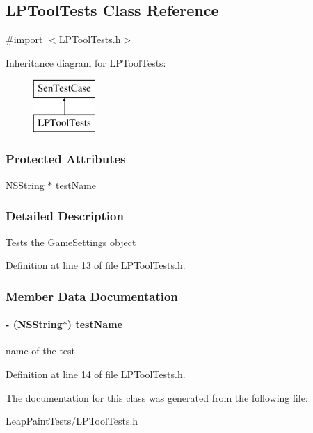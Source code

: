 \hypertarget{interface_l_p_tool_tests}{\subsection{L\-P\-Tool\-Tests Class Reference}
\label{d1/d2b/interface_l_p_tool_tests}
}


{\ttfamily \#import $<$L\-P\-Tool\-Tests.\-h$>$}

Inheritance diagram for L\-P\-Tool\-Tests\-:\begin{figure}[H]
\begin{center}
\leavevmode
\includegraphics[height=2.000000cm]{d1/d2b/interface_l_p_tool_tests}
\end{center}
\end{figure}
\subsubsection*{Protected Attributes}
\begin{DoxyCompactItemize}
\item 
N\-S\-String $\ast$ \hyperlink{interface_l_p_tool_tests_a3c6419a5af452250bc25319b2172b6cf}{test\-Name}
\end{DoxyCompactItemize}


\subsubsection{Detailed Description}
Tests the \hyperlink{interface_game_settings}{Game\-Settings} object 

Definition at line 13 of file L\-P\-Tool\-Tests.\-h.



\subsubsection{Member Data Documentation}
\hypertarget{interface_l_p_tool_tests_a3c6419a5af452250bc25319b2172b6cf}{
\paragraph[{test\-Name}]{\setlength{\rightskip}{0pt plus 5cm}-\/ (N\-S\-String$\ast$) test\-Name\hspace{0.3cm}{\ttfamily [protected]}}}\label{d1/d2b/interface_l_p_tool_tests_a3c6419a5af452250bc25319b2172b6cf}
name of the test 

Definition at line 14 of file L\-P\-Tool\-Tests.\-h.



The documentation for this class was generated from the following file\-:\begin{DoxyCompactItemize}
\item 
Leap\-Paint\-Tests/L\-P\-Tool\-Tests.\-h\end{DoxyCompactItemize}
